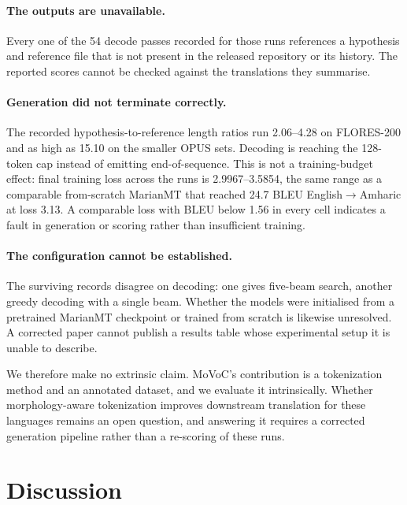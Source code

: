 \documentclass[11pt]{article}
\begin{document}
\paragraph{The outputs are unavailable.} Every one of the 54 decode passes
recorded for those runs references a hypothesis and reference file that is not
present in the released repository or its history. The reported scores cannot
be checked against the translations they summarise.

\paragraph{Generation did not terminate correctly.} The recorded
hypothesis-to-reference length ratios run 2.06--4.28 on FLORES-200 and as high
as 15.10 on the smaller OPUS sets. Decoding is reaching the 128-token cap
instead of emitting end-of-sequence. This is not a training-budget effect:
final training loss across the runs is 2.9967--3.5854, the same range as a
comparable from-scratch MarianMT that reached 24.7 BLEU
English$\rightarrow$Amharic at loss 3.13. A comparable loss with BLEU below
1.56 in every cell indicates a fault in generation or scoring rather than
insufficient training.

\paragraph{The configuration cannot be established.} The surviving records
disagree on decoding: one gives five-beam search, another greedy decoding with
a single beam. Whether the models were initialised from a pretrained MarianMT
checkpoint or trained from scratch is likewise unresolved. A corrected paper
cannot publish a results table whose experimental setup it is unable to
describe.

We therefore make no extrinsic claim. MoVoC's contribution is a tokenization
method and an annotated dataset, and we evaluate it intrinsically. Whether
morphology-aware tokenization improves downstream translation for these
languages remains an open question, and answering it requires a corrected
generation pipeline rather than a re-scoring of these runs.

\section{Discussion}
\label{sec:discussion}
\end{document}

